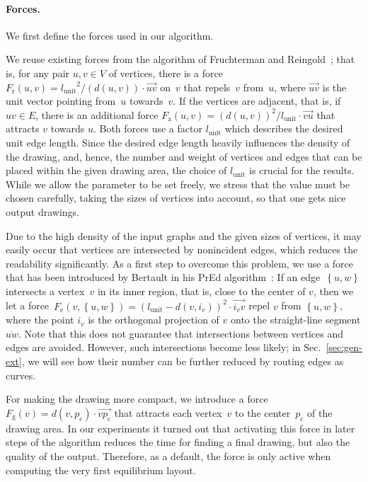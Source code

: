 \documentclass[]{llncs}
\newcommand{\pcenter}{\ensuremath{p_\mathrm{c}}\xspace}
\newcommand{\lunit}{\ensuremath{l_\mathrm{unit}}\xspace}
\newcommand{\frep}{\ensuremath{F_\mathrm{r}}\xspace}
\newcommand{\fatt}{\ensuremath{F_\mathrm{a}}\xspace}
\newcommand{\fedge}{\ensuremath{F_\mathrm{e}}\xspace}
\newcommand{\fgrav}{\ensuremath{F_\mathrm{g}}\xspace}
\begin{document}
\paragraph{Forces.}
\label{sec:gen-forces}
We first define the forces used in our algorithm.
\begin{compactitem}
  \item We reuse existing forces from the algorithm of Fruchterman and
    Reingold~\cite{Fruchterman1991}; that is, for any pair $u,v \in V$ of
    vertices, there is a force $\frep\left(u,v\right)=
    \lunit^{2}/(d\left(u,v\right))\cdot\overrightarrow{uv}$ on~$v$
		that repels~$v$ from~$u$, where $\overrightarrow{uv}$ is the unit
		vector pointing from~$u$ towards~$v$. If the vertices are
    adjacent, that is, if $uv \in E$, there is an additional force
		$\fatt(u,v)= (d(u,v))^{2}/\lunit\cdot\overrightarrow{v
		u}$ that attracts $v$ towards $u$.
		Both forces use a factor \lunit which describes the
		desired unit edge length. Since the desired edge length heavily
		influences the density of the drawing, and, hence, the number
		and weight of vertices and edges that can be placed within the
		given drawing area, the choice of $l_{\mathrm{unit}}$ is crucial
		for the results. While we allow the parameter to be set freely,
		we stress that the value must be chosen carefully, taking the
		sizes of vertices into account, so that one gets nice output
		drawings.
  \item Due to the high density of the input graphs and the given
    sizes of vertices, it may easily occur that vertices are
    intersected by nonincident edges, which reduces the readability
    significantly. As a first step to overcome this problem, we use a
    force that has been introduced by Bertault in his PrEd
    algorithm~\cite{Bertault2000}: If an edge~$\left\{ u,w \right\}$
    intersects a vertex~$v$ in its inner region, that is, close to the
    center of $v$, then we let a
    force~$\fedge\left(v,\left\{u,w\right\}\right)=
    {\left(\lunit-d\left(v,i_v\right)\right)}^{2} \cdot
    \overrightarrow{i_vv}$ repel $v$ from $\left\{ u,w
    \right\}$, where the point $i_v$ is the orthogonal projection of
		$v$ onto the straight-line segment $\overline{uw}$. Note that this does not guarantee
		that intersections between vertices and edges are avoided.
		However, such intersections become less likely; in
		Sec.~\ref{sec:gen-ext}, we will see how their number
		can be further reduced by routing edges as curves.
  \item For making the drawing more compact, we introduce a force
    $\fgrav(v)= d\left(v,\pcenter\right) \cdot
    \overrightarrow{v\pcenter}$ that attracts each
		vertex~$v$ to the center~\pcenter of the drawing area.
In our experiments it turned out that activating this force in
		later steps of the algorithm reduces the time for finding a final
		drawing, but also the quality of the output. Therefore, as a
		default, the force is only active when computing the very first
		equilibrium layout.
\end{compactitem}
\end{document}
